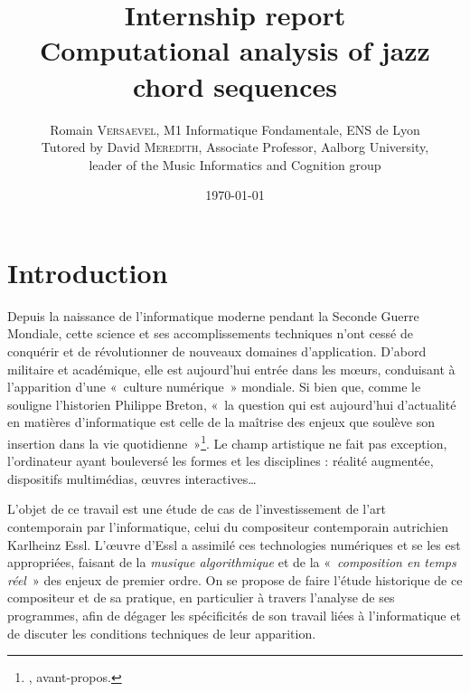 \documentclass[a4paper,12pt]{article}
\title{\Large Internship report \\ \LARGE Computational analysis of jazz chord sequences}
\author{\normalsize Romain \textsc{Versaevel}, M1 Informatique Fondamentale, ENS de Lyon\\
\normalsize Tutored by David \textsc{Meredith}, Associate Professor, Aalborg University,\\
\normalsize leader of the Music Informatics and Cognition group\\}
\date{\today}
\newcommand{\guill}[1]{«~#1~»}
\newcommand{\zitat}[2]{\#Citation(#2)\#}
\begin{document}

\tableofcontents

\newpage

\section{Introduction}

Depuis la naissance de l'informatique moderne pendant la Seconde Guerre Mondiale, cette science et ses accomplissements techniques n'ont cessé de conquérir et de révolutionner de nouveaux domaines d'application. D'abord militaire et académique, elle est aujourd'hui entrée dans les mœurs, conduisant à l'apparition d'une \guill{culture numérique} mondiale. Si bien que, comme le souligne l'historien Philippe Breton, \guill{la question qui est aujourd’hui d'actualité en matières d'informatique est celle de la maîtrise des enjeux que soulève son insertion dans la vie quotidienne}\footnote{\cite{breton1987histoire}, avant-propos.}. Le champ artistique ne fait pas exception, l'ordinateur ayant bouleversé les formes et les disciplines : réalité augmentée, dispositifs multimédias, œuvres interactives\dots

L'objet de ce travail est une étude de cas de l'investissement de l'art contemporain par l'informatique, celui du compositeur contemporain autrichien Karlheinz Essl. L'œuvre d'Essl a assimilé ces technologies numériques et se les est appropriées, faisant de la \emph{musique algorithmique} et de la \guill{\emph{composition en temps réel}} des enjeux de premier ordre. On se propose de faire l'étude historique de ce compositeur et de sa pratique, en particulier à travers l'analyse de ses programmes, afin de dégager les spécificités de son travail liées à l'informatique et de discuter les conditions techniques de leur apparition.

\end{document}
